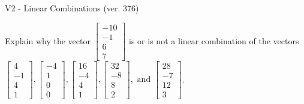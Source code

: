\begin{exercise}
  \begin{exerciseTitle}V2 - Linear Combinations (ver. 376)\end{exerciseTitle}
  \begin{exerciseStatement}
    Explain why the vector \(\left[\begin{array}{c}
-10 \\
-1 \\
6 \\
7
\end{array}\right]\)  is or is not a linear 
	combination of the vectors \(\left[\begin{array}{c}
4 \\
-1 \\
4 \\
1
\end{array}\right] , \left[\begin{array}{c}
-4 \\
1 \\
0 \\
0
\end{array}\right] , \left[\begin{array}{c}
16 \\
-4 \\
4 \\
1
\end{array}\right] , \left[\begin{array}{c}
32 \\
-8 \\
8 \\
2
\end{array}\right] , \text{ and } \left[\begin{array}{c}
28 \\
-7 \\
12 \\
3
\end{array}\right]\).
	



\end{exerciseStatement}
\end{exercise}

